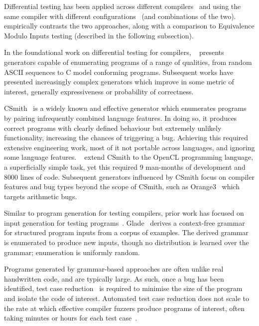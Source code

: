 Differential testing has been applied across different compilers~\cite{Chen2016b,Lidbury2015a} and using the same compiler with different configurations~\cite{Kyle2015b,Paka2011} (and combinations of the two). \citeauthor{Chen2014a}~\cite{Chen2014a} empirically contrasts the two approaches, along with a comparison to Equivalence Modulo Inputs testing (described in the following subsection).

In the foundational work on differential testing for compilers, \citeauthor{McKeeman1998}~\cite{McKeeman1998} presents generators capable of enumerating programs of a range of qualities, from random ASCII sequences to C model conforming programs. Subsequent works have presented increasingly complex generators which improve in some metric of interest, generally expressiveness or probability of correctness.

CSmith~\cite{Yang2011} is a widely known and effective generator which enumerates programs by pairing infrequently combined language features. In doing so, it produces correct programs with clearly defined behaviour but extremely unlikely functionality, increasing the chances of triggering a bug. Achieving this required extensive engineering work, most of it not portable across languages, and ignoring some language features. \citeauthor{Lidbury2015a}~\cite{Lidbury2015a} extend CSmith to the OpenCL programming language, a superficially simple task, yet this required 9 man-months of development and 8000 lines of code. Subsequent generators influenced by CSmith focus on compiler features and bug types beyond the scope of CSmith, such as Orange3~\cite{Nagai2013} which targets arithmetic bugs.

Similar to program generation for testing compilers, prior work has focused on input generation for testing programs~\cite{Godefroid2005,Claessen2014,Duregard2012,Fetscher2015a,Runciman2008}. Glade~\cite{Bastani2017} derives a context-free grammar for structured program inputs from a corpus of examples. The derived grammar is enumerated to produce new inputs, though no distribution is learned over the grammar; enumeration is uniformly random.

Programs generated by grammar-based approaches are often unlike real handwritten code, and are typically large. As such, once a bug has been identified, test case reduction~\cite{Regehr2012a} is required to minimise the size of the program and isolate the code of interest. Automated test case reduction does not scale to the rate at which effective compiler fuzzers produce programs of interest, often taking minutes or hours for each test case~\cite{Pflanzer2016}.

